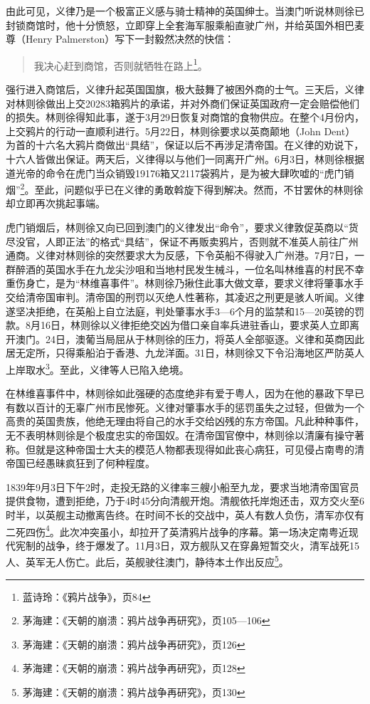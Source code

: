 由此可见，义律乃是一个极富正义感与骑士精神的英国绅士。当澳门听说林则徐已封锁商馆时，他十分愤怒，立即穿上全套海军服乘船直驶广州，并给英国外相巴麦尊（Henry Palmerston）写下一封毅然决然的快信：


\begin{quote}

我决心赶到商馆，否则就牺牲在路上\footnote{蓝诗玲：《鸦片战争》，页84}。

\end{quote}

强行进入商馆后，义律升起英国国旗，极大鼓舞了被困外商的士气。三天后，义律对林则徐做出上交20283箱鸦片的承诺，并对外商们保证英国政府一定会赔偿他们的损失。林则徐得知此事，遂于3月29日恢复对商馆的食物供应。在整个4月份内，上交鸦片的行动一直顺利进行。5月22日，林则徐要求以英商颠地（John Dent）为首的十六名大鸦片商做出“具结”，保证以后不再涉足清帝国。在义律的劝说下，十六人皆做出保证。两天后，义律得以与他们一同离开广州。6月3日，林则徐根据道光帝的命令在虎门当众销毁19176箱又2117袋鸦片，是为被大肆吹嘘的“虎门销烟”\footnote{茅海建：《天朝的崩溃：鸦片战争再研究》，页105—106}。至此，问题似乎已在义律的勇敢斡旋下得到解决。然而，不甘罢休的林则徐却立即再次挑起事端。

虎门销烟后，林则徐又向已回到澳门的义律发出“命令”，要求义律敦促英商以“货尽没官，人即正法”的格式“具结”，保证不再贩卖鸦片，否则就不准英人前往广州通商。义律对林则徐的突然要求大为反感，下令英船不得驶入广州港。7月7日，一群醉酒的英国水手在九龙尖沙咀和当地村民发生械斗，一位名叫林维喜的村民不幸重伤身亡，是为“林维喜事件”。林则徐乃揪住此事大做文章，要求义律将肇事水手交给清帝国审判。清帝国的刑罚以灭绝人性著称，其凌迟之刑更是骇人听闻。义律遂坚决拒绝，在英船上自立法庭，判处肇事水手3—6个月的监禁和15—20英镑的罚款。8月16日，林则徐以义律拒绝交凶为借口亲自率兵进驻香山，要求英人立即离开澳门。24日，澳葡当局屈从于林则徐的压力，将英人全部驱逐。义律和英商因此居无定所，只得乘船泊于香港、九龙洋面。31日，林则徐又下令沿海地区严防英人上岸取水\footnote{茅海建：《天朝的崩溃：鸦片战争再研究》，页126}。至此，义律等人已陷入绝境。

在林维喜事件中，林则徐如此强硬的态度绝非有爱于粤人，因为在他的暴政下早已有数以百计的无辜广州市民惨死。义律对肇事水手的惩罚虽失之过轻，但做为一个高贵的英国贵族，他绝无理由将自己的水手交给凶残的东方帝国。凡此种种事件，无不表明林则徐是个极度忠实的帝国奴。在清帝国官僚中，林则徐以清廉有操守著称。但就是这种帝国士大夫的模范人物都表现得如此丧心病狂，可见侵占南粤的清帝国已经愚昧疯狂到了何种程度。

1839年9月3日下午2时，走投无路的义律率三艘小船至九龙，要求当地清帝国官员提供食物，遭到拒绝，乃于4时45分向清舰开炮。清舰依托岸炮还击，双方交火至6时半，以英舰主动撤离告终。在时间不长的交战中，英人有数人负伤，清军亦仅有二死四伤\footnote{茅海建：《天朝的崩溃：鸦片战争再研究》，页128}。此次冲突虽小，却拉开了英清鸦片战争的序幕。第一场决定南粤近现代宪制的战争，终于爆发了。11月3日，双方舰队又在穿鼻短暂交火，清军战死15人、英军无人伤亡。此后，英舰驶往澳门，静待本土作出反应\footnote{茅海建：《天朝的崩溃：鸦片战争再研究》，页130}。

